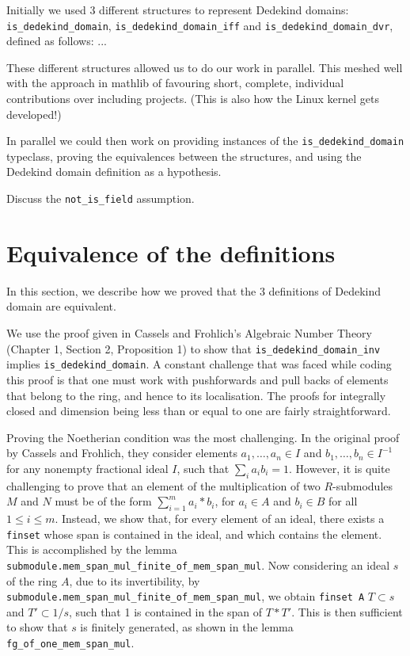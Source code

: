 \documentclass[a4paper,USenglish,cleveref, autoref, thm-restate]{lipics-v2021}
\newcommand{\lean}[1]{\texttt{#1}\xspace} %
\begin{document}
Initially we used 3 different structures to represent Dedekind domains: \lean{is\_dedekind\_domain}, \lean{is\_dedekind\_domain\_iff} and \lean{is\_dedekind\_domain\_dvr}, defined as follows:
...

These different structures allowed us to do our work in parallel. This meshed well with the approach in mathlib of favouring short, complete, individual contributions over including projects. (This is also how the Linux kernel gets developed!)

In parallel we could then work on providing instances of the \lean{is\_dedekind\_domain} typeclass, proving the equivalences between the structures, and using the Dedekind domain definition as a hypothesis.

Discuss the \lean{not\_is\_field} assumption.

\section{Equivalence of the definitions}

In this section, we describe how we proved that the 3 definitions of Dedekind domain are equivalent.

We use the proof given in Cassels and Frohlich's Algebraic Number Theory (Chapter 1, Section 2, Proposition 1) to show that \lean{is\_dedekind\_domain\_inv} implies \lean{is\_dedekind\_domain}. A constant challenge that was faced while coding this proof is that one must work with pushforwards and pull backs of elements that belong to the ring, and hence to its localisation. The proofs for integrally closed and dimension being less than or equal to one are fairly straightforward.

Proving the Noetherian condition was the most challenging.
In the original proof by Cassels and Frohlich, they consider elements $a_1, \dots, a_n \in I$ and $b_1, \dots, b_n \in I^{-1}$ for any nonempty fractional ideal $I$,
such that $ \sum_i a_i b_i = 1 $.
However, it is quite challenging to prove that an element of the multiplication of two $R$-submodules $M$ and $N$ must be of the form $\sum_{i = 1}^m a_i*b_i$, for $a_i \in A$ and $b_i \in B$ for all $1 \leq i \leq m$.
Instead, we show that, for every element of an ideal, there exists a \lean{finset} whose span is contained in the ideal, and which contains the element.
This is accomplished by the lemma \lean{submodule.mem\_span\_mul\_finite\_of\_mem\_span\_mul}.
Now considering an ideal $s$ of the ring $A$, due to its invertibility, by \lean{submodule.mem\_span\_mul\_finite\_of\_mem\_span\_mul}, we obtain \lean{finset A} $T \subset s$ and $T' \subset 1/s$, such that 1 is contained in the span of $T*T'$.
This is then sufficient to show that $s$ is finitely generated, as shown in the lemma \lean{fg\_of\_one\_mem\_span\_mul}.
\end{document}
